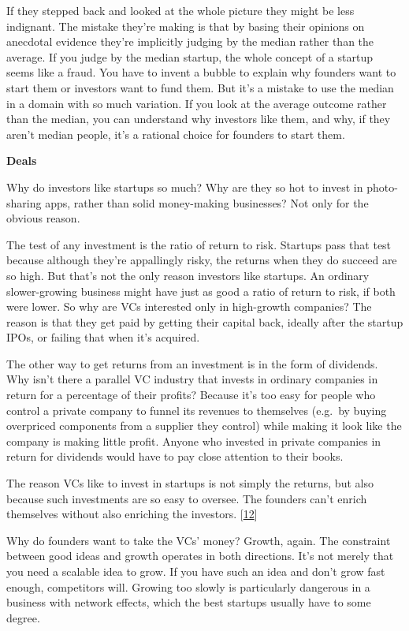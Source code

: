 If they stepped back and looked at the whole picture they might be less
indignant. The mistake they're making is that by basing their opinions
on anecdotal evidence they're implicitly judging by the median rather
than the average. If you judge by the median startup, the whole concept
of a startup seems like a fraud. You have to invent a bubble to explain
why founders want to start them or investors want to fund them. But it's
a mistake to use the median in a domain with so much variation. If you
look at the average outcome rather than the median, you can understand
why investors like them, and why, if they aren't median people, it's a
rational choice for founders to start them.

\textbf{Deals}

Why do investors like startups so much? Why are they so hot to invest in
photo-sharing apps, rather than solid money-making businesses? Not only
for the obvious reason.

The test of any investment is the ratio of return to risk. Startups pass
that test because although they're appallingly risky, the returns when
they do succeed are so high. But that's not the only reason investors
like startups. An ordinary slower-growing business might have just as
good a ratio of return to risk, if both were lower. So why are VCs
interested only in high-growth companies? The reason is that they get
paid by getting their capital back, ideally after the startup IPOs, or
failing that when it's acquired.

The other way to get returns from an investment is in the form of
dividends. Why isn't there a parallel VC industry that invests in
ordinary companies in return for a percentage of their profits? Because
it's too easy for people who control a private company to funnel its
revenues to themselves (e.g.~by buying overpriced components from a
supplier they control) while making it look like the company is making
little profit. Anyone who invested in private companies in return for
dividends would have to pay close attention to their books.

The reason VCs like to invest in startups is not simply the returns, but
also because such investments are so easy to oversee. The founders can't
enrich themselves without also enriching the investors.
{[}\hyperref[f12n]{12}{]}

Why do founders want to take the VCs' money? Growth, again. The
constraint between good ideas and growth operates in both directions.
It's not merely that you need a scalable idea to grow. If you have such
an idea and don't grow fast enough, competitors will. Growing too slowly
is particularly dangerous in a business with network effects, which the
best startups usually have to some degree.

